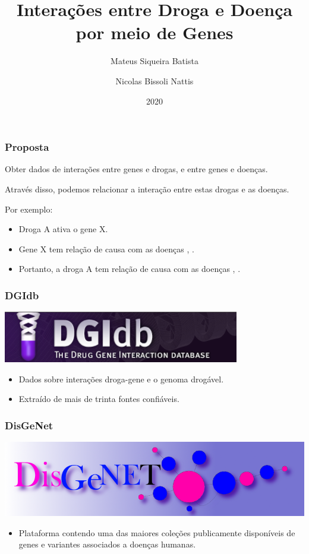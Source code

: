 \documentclass[12pt]{beamer}
\title{Interações entre Droga e Doença por meio de Genes}
\author{
  Mateus Siqueira Batista\and
  Nicolas Bissoli Nattis
}
\institute{
  MC536 - Instituto de Computação, UNICAMP
}
\date[2020]{2020}
\begin{document}
\frame{\titlepage}

\begin{frame}
  \frametitle{Proposta}
  Obter dados de interações entre genes e drogas, e entre genes e doenças.
  \pause

  Através disso, podemos relacionar a interação entre estas drogas e as doenças.
  \pause

  Por exemplo:
  \begin{itemize}
    \item Droga A ativa o gene X.
    \item Gene X tem relação de causa com as doenças \textalpha, \textgamma.
    \item Portanto, a droga A tem relação de causa com as doenças \textalpha, \textgamma.
  \end{itemize}
\end{frame}

\begin{frame}
  \frametitle{DGIdb}
  \centering
  \includegraphics[scale=0.5]{dgi}
  \vspace*{1 cm}
  \begin{itemize}
    \item Dados sobre interações droga-gene e o genoma drogável.
    \item Extraído de mais de trinta fontes confiáveis.
  \end{itemize}
\end{frame}

\begin{frame}
  \frametitle{DisGeNet}
  \centering
  \includegraphics[scale=0.25]{disgenet}
  \vspace*{1 cm}
  \begin{itemize}
    \item Plataforma contendo uma das maiores coleções publicamente disponíveis
          de genes e variantes associados a doenças humanas.
  \end{itemize}
\end{frame}
\end{document}
